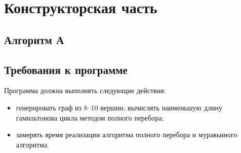 \chapter{Конструкторская часть}

\section{Алгоритм А}

\clearpage

\section{Требования к программе}
Программа должна выполнять следующие действия:
\begin{itemize}
	\item генерировать граф из 8--10 вершин, вычислять наименьшую длину гамильтонова цикла методом полного перебора;
	\item замерять время реализации алгоритма полного перебора и муравьиного алгоритма.
\end{itemize}

